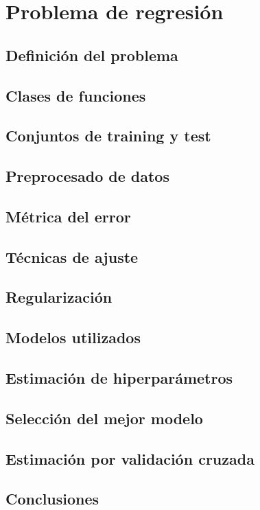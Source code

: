 \chapter{Problema de regresión}
\section{Definición del problema}
\section{Clases de funciones}
\section{Conjuntos de training y test}
\section{Preprocesado de datos}
\section{Métrica del error}
\section{Técnicas de ajuste}
\section{Regularización}
\section{Modelos utilizados}
\section{Estimación de hiperparámetros}
\section{Selección del mejor modelo}
\section{Estimación por validación cruzada}
\section{Conclusiones}
